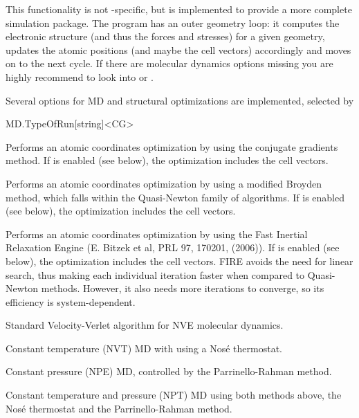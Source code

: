 

This functionality is not \siesta-specific, but is implemented to
provide a more complete simulation package. The program has an outer
geometry loop: it computes the electronic structure (and
thus the forces and stresses) for a given geometry, updates the
atomic positions (and maybe the cell vectors) accordingly and moves on
to the next cycle.
%
If there are molecular dynamics options missing you are highly
recommend to look into  or
.


Several options for MD and structural optimizations are
implemented, selected by
\begin{fdfentry}{MD.TypeOfRun}[string]<CG>

  \begin{fdfoptions}

    \option[CG]%
    Performs an atomic coordinates optimization by using the conjugate gradients
    method. If  is enabled (see below), the optimization
    includes the cell vectors.

    \option[Broyden]%
    Performs an atomic coordinates optimization by using a modified Broyden
    method, which falls within the Quasi-Newton family of algorithms. If
     is enabled (see below), the optimization includes
    the cell vectors.

    \option[FIRE]%
    Performs an atomic coordinates optimization by using the Fast Inertial
    Relaxation Engine (E. Bitzek et al, PRL 97, 170201, (2006)). If
     is enabled (see below), the optimization includes
    the cell vectors.
    FIRE avoids the need for linear search, thus making each individual iteration
    faster when compared to Quasi-Newton methods. However, it also needs more
    iterations to converge, so its efficiency is system-dependent.

    \option[Verlet]%
    Standard Velocity-Verlet algorithm for NVE molecular dynamics.

    \option[Nose]%
    Constant temperature (NVT) MD with using a Nos\'e thermostat.

    \option[ParrinelloRahman]%
    Constant pressure (NPE) MD, controlled by the Parrinello-Rahman method.

    \option[NoseParrinelloRahman]%
    Constant temperature and pressure (NPT) MD using both methods above, the
    Nos\'e thermostat and the Parrinello-Rahman method.


\end{fdfoptions}
\end{fdfentry}
